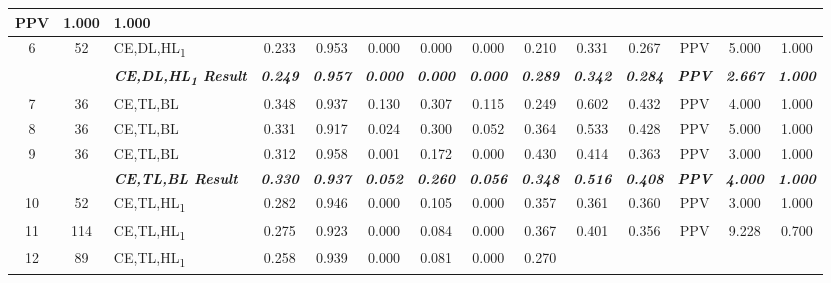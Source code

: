 \begin{table}[H]
{\begin{tabular}{cc|l|c|c|c|c|c|c|c|c|c|c|c|}
    PPV &
    1.000 &
    1.000 \\ \hline
  \multicolumn{1}{|c|}{6} &
    52 &
    CE,DL,HL\textsubscript{1} &
    0.233 &
    0.953 &
    0.000 &
    0.000 &
    0.000 &
    0.210 &
    0.331 &
    0.267 &
    PPV &
    5.000 &
    1.000 \\ \hline
  \textit{\textbf{}} &
    \textit{\textbf{}} &
    \textit{\textbf{CE,DL,HL\textsubscript{1} Result}} &
    \textit{\textbf{0.249}} &
    \textit{\textbf{0.957}} &
    \textit{\textbf{0.000}} &
    \textit{\textbf{0.000}} &
    \textit{\textbf{0.000}} &
    \textit{\textbf{0.289}} &
    \textit{\textbf{0.342}} &
    \textit{\textbf{0.284}} &
    \textit{\textbf{PPV}} &
    \textit{\textbf{2.667}} &
    \textit{\textbf{1.000}} \\ \hline
  \multicolumn{1}{|c|}{7} &
    36 &
    CE,TL,BL &
    0.348 &
    0.937 &
    0.130 &
    0.307 &
    0.115 &
    0.249 &
    0.602 &
    0.432 &
    PPV &
    4.000 &
    1.000 \\ \hline
  \multicolumn{1}{|c|}{8} &
    36 &
    CE,TL,BL &
    0.331 &
    0.917 &
    0.024 &
    0.300 &
    0.052 &
    0.364 &
    0.533 &
    0.428 &
    PPV &
    5.000 &
    1.000 \\ \hline
  \multicolumn{1}{|c|}{9} &
    36 &
    CE,TL,BL &
    0.312 &
    0.958 &
    0.001 &
    0.172 &
    0.000 &
    0.430 &
    0.414 &
    0.363 &
    PPV &
    3.000 &
    1.000 \\ \hline
  \textit{\textbf{}} &
    \textit{\textbf{}} &
    \textit{\textbf{CE,TL,BL Result}} &
    \textit{\textbf{0.330}} &
    \textit{\textbf{0.937}} &
    \textit{\textbf{0.052}} &
    \textit{\textbf{0.260}} &
    \textit{\textbf{0.056}} &
    \textit{\textbf{0.348}} &
    \textit{\textbf{0.516}} &
    \textit{\textbf{0.408}} &
    \textit{\textbf{PPV}} &
    \textit{\textbf{4.000}} &
    \textit{\textbf{1.000}} \\ \hline
  \multicolumn{1}{|c|}{10} &
    52 &
    CE,TL,HL\textsubscript{1} &
    0.282 &
    0.946 &
    0.000 &
    0.105 &
    0.000 &
    0.357 &
    0.361 &
    0.360 &
    PPV &
    3.000 &
    1.000 \\ \hline
  \multicolumn{1}{|c|}{11} &
    114 &
    CE,TL,HL\textsubscript{1} &
    0.275 &
    0.923 &
    0.000 &
    0.084 &
    0.000 &
    0.367 &
    0.401 &
    0.356 &
    PPV &
    9.228 &
    0.700 \\ \hline
  \multicolumn{1}{|c|}{12} &
    89 &
    CE,TL,HL\textsubscript{1} &
    0.258 &
    0.939 &
    0.000 &
    0.081 &
    0.000 &
    0.270 &

\end{tabular}}
\end{table}
